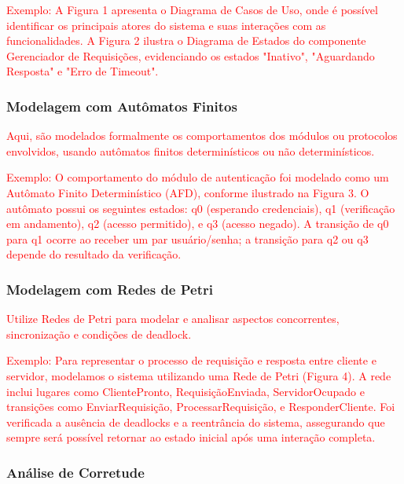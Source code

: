 \textcolor{red}{Exemplo:
%
A Figura 1 apresenta o Diagrama de Casos de Uso, onde é possível identificar os principais atores do sistema e suas interações com as funcionalidades.
A Figura 2 ilustra o Diagrama de Estados do componente Gerenciador de Requisições, evidenciando os estados "Inativo", "Aguardando Resposta" e "Erro de Timeout".}


\subsubsection{Modelagem com Autômatos Finitos}

\textcolor{red}{Aqui, são modelados formalmente os comportamentos dos módulos ou protocolos envolvidos, usando autômatos finitos determinísticos ou não determinísticos.}

\textcolor{red}{Exemplo:
%
O comportamento do módulo de autenticação foi modelado como um Autômato Finito Determinístico (AFD), conforme ilustrado na Figura 3.
O autômato possui os seguintes estados: q0 (esperando credenciais), q1 (verificação em andamento), q2 (acesso permitido), e q3 (acesso negado).
A transição de q0 para q1 ocorre ao receber um par usuário/senha; a transição para q2 ou q3 depende do resultado da verificação.}


\subsubsection{Modelagem com Redes de Petri}

\textcolor{red}{Utilize Redes de Petri para modelar e analisar aspectos concorrentes, sincronização e condições de deadlock.}

\textcolor{red}{Exemplo:
%
Para representar o processo de requisição e resposta entre cliente e servidor, modelamos o sistema utilizando uma Rede de Petri (Figura 4).
A rede inclui lugares como ClientePronto, RequisiçãoEnviada, ServidorOcupado e transições como EnviarRequisição, ProcessarRequisição, e ResponderCliente.
Foi verificada a ausência de deadlocks e a reentrância do sistema, assegurando que sempre será possível retornar ao estado inicial após uma interação completa.}


\subsubsection{Análise de Corretude}



